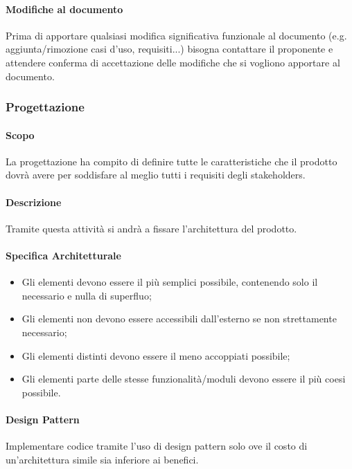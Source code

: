 \documentclass[a4paper, 12pt]{article}
\begin{document}
\paragraph{Modifiche al documento}
Prima di apportare qualsiasi modifica significativa funzionale al documento (e.g.
aggiunta/rimozione casi d'uso, requisiti...) bisogna contattare il proponente
e attendere conferma di accettazione delle modifiche che si vogliono apportare
al documento.

\subsubsection{Progettazione}
\paragraph{Scopo}
La progettazione ha compito di definire tutte le caratteristiche che il prodotto dovrà avere per soddisfare al meglio
tutti i requisiti degli stakeholders.
\paragraph{Descrizione}
Tramite questa attività si andrà a fissare l'architettura del prodotto.
\paragraph{Specifica Architetturale}
\begin{itemize}
	\item Gli elementi devono essere il più semplici possibile, contenendo solo il necessario e nulla di superfluo;
	\item Gli elementi non devono essere accessibili dall'esterno se non strettamente necessario;
	\item Gli elementi distinti devono essere il meno accoppiati possibile;
	\item Gli elementi parte delle stesse funzionalità/moduli devono essere il più coesi possibile.
\end{itemize}
\paragraph{Design Pattern}
Implementare codice tramite l'uso di design pattern solo ove il costo di un'architettura simile sia inferiore ai benefici.
\end{document}
